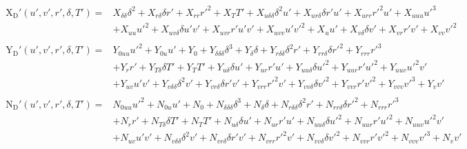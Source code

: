 \documentclass[review]{elsarticle}
\begin{document}
\begin{equation}\label{equation:02.01_VMMs:eqxabkowitz}
\begin{split}\begin{split}
\operatorname{X_{D}'}{\left(u',v',r',\delta,T' \right)} = & X_{\delta\delta} \delta^{2} + X_{r\delta} \delta r' + X_{rr} r'^{2} + X_{T} T' + X_{u\delta\delta} \delta^{2} u' + X_{ur\delta} \delta r' u' + X_{urr} r'^{2} u' + X_{uuu} u'^{3} \\
& + X_{uu} u'^{2} + X_{uv\delta} \delta u' v' + X_{uvr} r' u' v' + X_{uvv} u' v'^{2} + X_{u} u' + X_{v\delta} \delta v' + X_{vr} r' v' + X_{vv} v'^{2} 
\end{split}\end{split}
\end{equation}\begin{equation}\label{equation:02.01_VMMs:eqyabkowitz}
\begin{split}\begin{split}
\operatorname{Y_{D}'}{\left(u',v',r',\delta,T' \right)} = & Y_{0uu} u'^{2} + Y_{0u} u' + Y_{0} + Y_{\delta\delta\delta} \delta^{3} + Y_{\delta} \delta + Y_{r\delta\delta} \delta^{2} r' + Y_{rr\delta} \delta r'^{2} + Y_{rrr} r'^{3} \\
& + Y_{r} r' + Y_{T\delta} \delta T' + Y_{T} T' + Y_{u\delta} \delta u' + Y_{ur} r' u' + Y_{uu\delta} \delta u'^{2} + Y_{uur} r' u'^{2} + Y_{uuv} u'^{2} v' \\
& + Y_{uv} u' v' + Y_{v\delta\delta} \delta^{2} v' + Y_{vr\delta} \delta r' v' + Y_{vrr} r'^{2} v' + Y_{vv\delta} \delta v'^{2} + Y_{vvr} r' v'^{2} + Y_{vvv} v'^{3} + Y_{v} v' 
\end{split}\end{split}
\end{equation}\begin{equation}\label{equation:02.01_VMMs:eqnabkowitz}
\begin{split}\begin{split}
\operatorname{N_{D}'}{\left(u',v',r',\delta,T' \right)} = & N_{0uu} u'^{2} + N_{0u} u' + N_{0} + N_{\delta\delta\delta} \delta^{3} + N_{\delta} \delta + N_{r\delta\delta} \delta^{2} r' + N_{rr\delta} \delta r'^{2} + N_{rrr} r'^{3} \\
& + N_{r} r' + N_{T\delta} \delta T' + N_{T} T' + N_{u\delta} \delta u' + N_{ur} r' u' + N_{uu\delta} \delta u'^{2} + N_{uur} r' u'^{2} + N_{uuv} u'^{2} v' \\
& + N_{uv} u' v' + N_{v\delta\delta} \delta^{2} v' + N_{vr\delta} \delta r' v' + N_{vrr} r'^{2} v' + N_{vv\delta} \delta v'^{2} + N_{vvr} r' v'^{2} + N_{vvv} v'^{3} + N_{v} v' 
\end{split}\end{split}
\end{equation}
\end{document}
